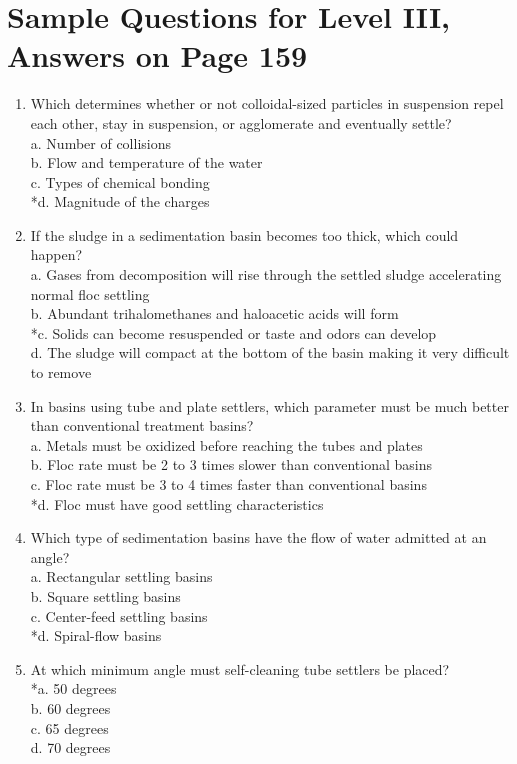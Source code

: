 \section{Sample Questions for Level III, Answers on Page 159}
\begin{enumerate}[label=TIII-\arabic*]
  \item Which determines whether or not colloidal-sized particles in suspension repel each other, stay in suspension, or agglomerate and eventually settle?\\
a. Number of collisions\\
b. Flow and temperature of the water\\
c. Types of chemical bonding\\
*d. Magnitude of the charges\\
  \item If the sludge in a sedimentation basin becomes too thick, which could happen?\\
a. Gases from decomposition will rise through the settled sludge accelerating normal floc settling\\
b. Abundant trihalomethanes and haloacetic acids will form\\
*c. Solids can become resuspended or taste and odors can develop\\
d. The sludge will compact at the bottom of the basin making it very difficult to remove\\
  \item In basins using tube and plate settlers, which parameter must be much better than conventional treatment basins?\\
a. Metals must be oxidized before reaching the tubes and plates\\
b. Floc rate must be 2 to 3 times slower than conventional basins\\
c. Floc rate must be 3 to 4 times faster than conventional basins\\
*d. Floc must have good settling characteristics \\
\item Which type of sedimentation basins have the flow of water admitted at an angle?\\
a. Rectangular settling basins\\
b. Square settling basins\\
c. Center-feed settling basins\\
*d. Spiral-flow basins\\
  \item At which minimum angle must self-cleaning tube settlers be placed?\\
*a. 50 degrees\\
b. 60 degrees\\
c. 65 degrees\\
d. 70 degrees\\
\end{enumerate}
